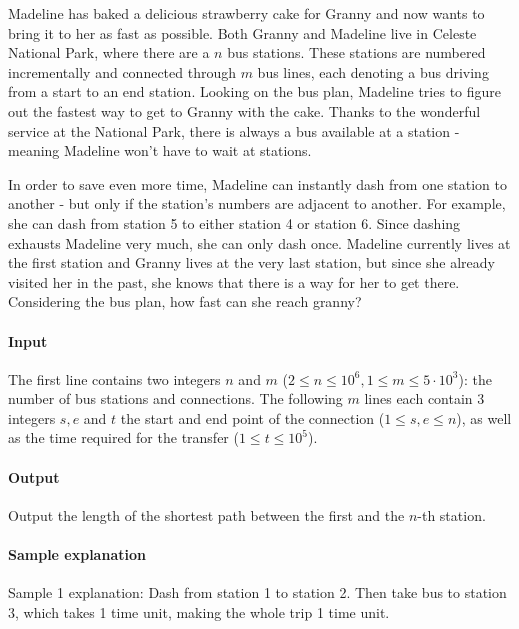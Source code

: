 



\makeheader

Madeline has baked a delicious strawberry cake for Granny and now wants to bring it to her as fast as possible.
Both Granny and Madeline live in Celeste National Park, where there are a $n$ bus stations.
These stations are numbered incrementally and connected through $m$ bus lines, each denoting a bus driving from a start to an end station.
Looking on the bus plan, Madeline tries to figure out the fastest way to get to Granny with the cake.
Thanks to the wonderful service at the National Park, there is always a bus available at a station - meaning Madeline won't have to wait at stations.


In order to save even more time, Madeline can instantly dash from one station to another - but only if the station's numbers are adjacent to another.
For example, she can dash from station 5 to either station 4 or station 6.
Since dashing exhausts Madeline very much, she can only dash once.
Madeline currently lives at the first station and Granny lives at the very last station, but since she already visited her in the past, she knows that there is a way for her to get there.
Considering the bus plan, how fast can she reach granny?

\paragraph*{Input}

The first line contains two integers $n$ and $m$ ($2 \leq n \leq 10^6, 1 \leq m \leq 5 \cdot 10^3$): the number of bus stations and connections.
The following $m$ lines each contain 3 integers $s,e$ and $t$ the start and end point of the connection ($1 \leq s,e \leq n$), as well as the time required for the transfer ($1 \leq t \leq 10^5$).

\paragraph*{Output}

Output the length of the shortest path between the first and the $n$-th station.

\begin{samples}
\end{samples}

\paragraph*{Sample explanation}

Sample 1 explanation: Dash from station 1 to station 2. Then take bus to station 3, which takes 1 time unit, making the whole trip 1 time unit.

